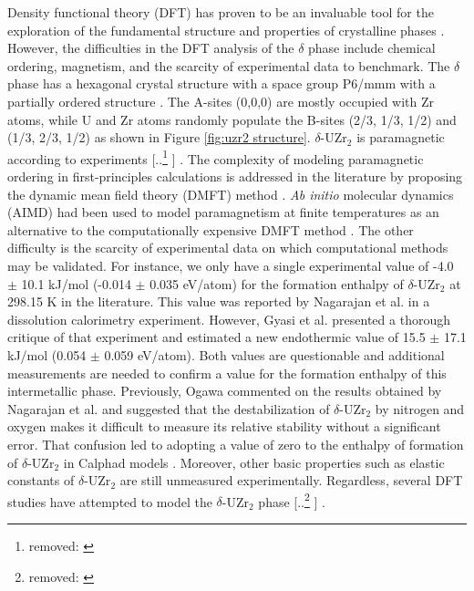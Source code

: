 \documentclass[preprint,12pt]{elsarticle}
\providecommand{\DIFadd}[1]{{\protect\color{blue} \sf #1}} %
\providecommand{\DIFdel}[1]{{\protect\color{red} [..\footnote{removed: #1} ]}} %
\providecommand{\DIFaddbegin}{} %
\providecommand{\DIFaddend}{} %
\providecommand{\DIFdelbegin}{} %
\providecommand{\DIFdelend}{} %
\newcommand{\DIFscaledelfig}{0.5}
\newlength{\DIFdelgraphicswidth} %
\newlength{\DIFdelgraphicsheight} %
\newcommand{\DIFaddincludegraphics}[2][]{{\color{blue}\fbox{\DIFOincludegraphics[#1]{#2}}}} %
\newcommand{\DIFdelincludegraphics}[2][]{%
\sbox{\DIFdelgraphicsbox}{\DIFOincludegraphics[#1]{#2}}%
\settoboxwidth{\DIFdelgraphicswidth}{\DIFdelgraphicsbox} %
\settoboxtotalheight{\DIFdelgraphicsheight}{\DIFdelgraphicsbox} %
\scalebox{\DIFscaledelfig}{%
\parbox[b]{\DIFdelgraphicswidth}{\usebox{\DIFdelgraphicsbox}\\[-\baselineskip] \rule{\DIFdelgraphicswidth}{0em}}\llap{\resizebox{\DIFdelgraphicswidth}{\DIFdelgraphicsheight}{%
\setlength{\unitlength}{\DIFdelgraphicswidth}%
\begin{picture}(1,1)%
\thicklines\linethickness{2pt} %
{\color[rgb]{1,0,0}\put(0,0){\framebox(1,1){}}}%
{\color[rgb]{1,0,0}\put(0,0){\line( 1,1){1}}}%
{\color[rgb]{1,0,0}\put(0,1){\line(1,-1){1}}}%
\end{picture}%
}\hspace*{3pt}}} %
} %
\DeclareRobustCommand{\DIFaddbegin}{\DIFOaddbegin \let\includegraphics\DIFaddincludegraphics} %
\DeclareRobustCommand{\DIFaddend}{\DIFOaddend \let\includegraphics\DIFOincludegraphics} %
\DeclareRobustCommand{\DIFdelbegin}{\DIFOdelbegin \let\includegraphics\DIFdelincludegraphics} %
\DeclareRobustCommand{\DIFdelend}{\DIFOaddend \let\includegraphics\DIFOincludegraphics} %
\begin{document}
Density functional theory (DFT) has proven to be an invaluable tool for the exploration of the fundamental structure and properties of crystalline phases  \cite{cohen_challenges_2012, burke_perspective_2012}. However, the difficulties in the DFT analysis of the $\delta$ phase include chemical ordering, magnetism, and the scarcity of experimental data to benchmark. The $\delta$ phase has a hexagonal crystal structure with a space group P6/mmm with a partially ordered structure  \cite{akabori_stability_1992, akabori_lattice_1995}. The A-sites (0,0,0) are mostly occupied with Zr atoms, while U and Zr atoms randomly populate the B-sites (2/3, 1/3, 1/2) and (1/3, 2/3, 1/2) as shown in Figure \ref{fig:uzr2 structure}. $\delta$-UZr$_2$ is paramagnetic according to experiments  \DIFdelbegin \DIFdel{\cite{ding_magnetic_2020}}\DIFdelend \DIFaddbegin \DIFadd{\cite{ding_magnetic_2021}}\DIFaddend . The complexity of modeling paramagnetic ordering in first-principles calculations is addressed in the literature by proposing the dynamic mean field theory (DMFT) method  \cite{anisimov_investigation_2014, abrikosov_recent_2016}. \textit{Ab initio} molecular dynamics (AIMD) had been used to model paramagnetism at finite temperatures as an alternative to the computationally expensive DMFT method  \cite{steneteg_equation_2012}. 
The other difficulty is the scarcity of experimental data on which computational methods may be validated. For instance, we only have a single experimental value of -4.0 $\pm$ 10.1 kJ/mol (-0.014 $\pm$ 0.035 eV/atom) for the formation enthalpy of $\delta$-UZr$_2$ at 298.15 K in the literature. This value was reported by Nagarajan et al. \cite{nagarajan_enthalpy_1993} in a dissolution calorimetry experiment. However, Gyasi et al. \cite{gyasi_about_2022} presented a thorough critique of that experiment and estimated a new endothermic value of 15.5 $\pm$ 17.1 kJ/mol (0.054 $\pm$ 0.059 eV/atom). Both values are questionable and additional measurements are needed to confirm a value for the formation enthalpy of this intermetallic phase. Previously, Ogawa \cite{ogawa_free_1994} commented on the results obtained by Nagarajan et al. \cite{nagarajan_enthalpy_1993} and suggested that the destabilization of $\delta$-UZr$_2$ by nitrogen and oxygen makes it difficult to measure its relative stability without a significant error. That confusion led to adopting a value of zero to the enthalpy of formation of $\delta$-UZr$_2$ in Calphad models \cite{chevalier_progress_2004}. Moreover, other basic properties such as elastic constants of $\delta$-UZr$_2$ are still unmeasured experimentally. Regardless, several DFT studies have attempted to model the $\delta$-UZr$_{2}$ phase \DIFdelbegin \DIFdel{\cite{xie_correlation_2013, matar_first_2017, ding_magnetic_2020, ghosh_chemical_2021}}\DIFdelend \DIFaddbegin \DIFadd{\cite{landa_density-functional_2009, xie_correlation_2013, matar_first_2017, ghosh_chemical_2021}}\DIFaddend . 
\end{document}
